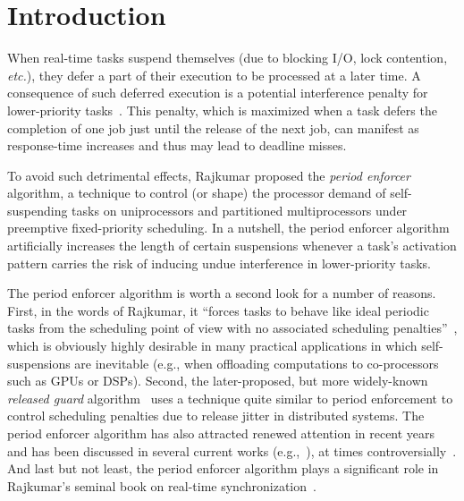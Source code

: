 


\section{Introduction} 
When real-time tasks suspend themselves (due to blocking I/O, lock contention, \textit{etc.}), they defer a part of their execution to be processed at a later time. A consequence of such deferred execution is a potential interference penalty for lower-priority tasks~\cite{LSS:87,LSST:91,Ra:90,ABRTW:93,SLS:95,WC16-suspend-DATE,ecrts15nelissen}. This penalty, which is maximized when a task defers the completion of one job just until the release of the next job, can manifest as response-time increases and thus may lead to deadline misses.

To avoid such detrimental effects,  Rajkumar \cite{Raj:suspension1991} proposed the \emph{period enforcer} algorithm,  a technique to control (or shape) the processor demand of self-suspending tasks on uniprocessors and partitioned multiprocessors under preemptive fixed-priority scheduling. In a nutshell, the period enforcer algorithm artificially increases the length of certain suspensions whenever a task's activation pattern carries the risk of inducing undue interference in lower-priority tasks. 

The period enforcer algorithm is worth a second look for a number of reasons. First, in the words of Rajkumar, it ``forces tasks to behave like ideal periodic tasks from the scheduling point of view with no associated scheduling penalties''~\cite{Raj:suspension1991}, which is obviously highly desirable in many practical applications in which self-suspensions are inevitable (e.g., when offloading computations to co-processors such as GPUs or DSPs). Second, the later-proposed, but more widely-known \emph{released guard} algorithm~\cite{SL:96} uses a technique quite similar to period enforcement to control scheduling penalties due to release jitter in distributed systems. The period enforcer algorithm has also attracted renewed attention in recent years and has been discussed in several current works  (e.g.,~\cite{DBLP:conf/rtss/ChenL14,LNR:09,LR:10,Lak:11,LC:14,KANR:13,HY:11,CA:09,CA:10,CA:10b}), at times controversially~\cite{BA:08a}. And last but not least, the period enforcer algorithm plays a significant role in Rajkumar's seminal book on   real-time  synchronization~\cite{Raj:91}. 

